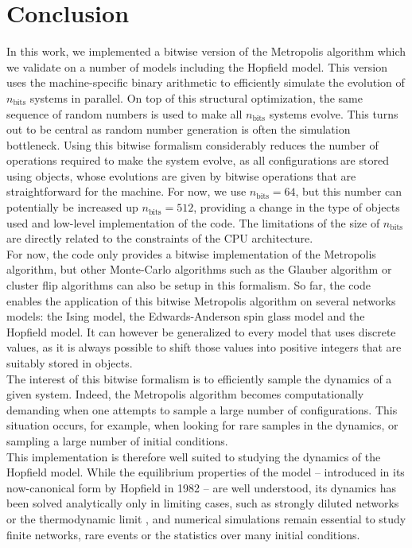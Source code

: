 \section{Conclusion}\label{sec:conclusion}

In this work, we implemented a bitwise version of the Metropolis algorithm which we validate on a number of models including the Hopfield model. This version uses the machine-specific binary arithmetic to efficiently simulate the evolution of $n_\text{bits}$ systems in parallel. On top of this structural optimization, the same sequence of random numbers is used to make all $n_\text{bits}$ systems evolve. This turns out to be central as random number generation is often the simulation bottleneck. Using this bitwise formalism considerably reduces the number of operations required to make the system evolve, as all configurations are stored using \Bits objects, whose evolutions are given by bitwise operations that are straightforward for the machine. For now, we use $n_\text{bits}=64$, but this number can potentially be increased up $n_\text{bits}=512$, providing a change in the type of objects used and low-level implementation of the code. The limitations of the size of $n_\text{bits}$ are directly related to the constraints of the CPU architecture.\\
For now, the code only provides a bitwise implementation of the Metropolis algorithm, but other Monte-Carlo algorithms such as the Glauber algorithm \cite{Glauber1963} or cluster flip algorithms \cite{SwendsenWang1987,Wolff1989} can also be setup in this formalism. So far, the code enables the application of this bitwise Metropolis algorithm on several networks models: the Ising model, the Edwards-Anderson spin glass model and the Hopfield model. It can however be generalized to every model that uses discrete values, as it is always possible to shift those values into positive integers that are suitably stored in \UnsignedInt objects.\\
The interest of this bitwise formalism is to efficiently sample the dynamics of a given system. Indeed, the Metropolis algorithm becomes computationally demanding when one attempts to sample a large number of configurations. This situation occurs, for example, when looking for rare samples in the dynamics, or sampling a large number of initial conditions.\\
This implementation is therefore well suited to studying the dynamics of the Hopfield model. While the equilibrium properties of the model -- introduced in its now-canonical form by Hopfield in 1982 \cite{Hopfield1982} -- are well understood, its dynamics has been solved analytically only in limiting cases, such as strongly diluted networks \cite{Derrida1987} or the thermodynamic limit \cite{Coolen2001}, and numerical simulations remain essential to study finite networks, rare events or the statistics over many initial conditions. \\
